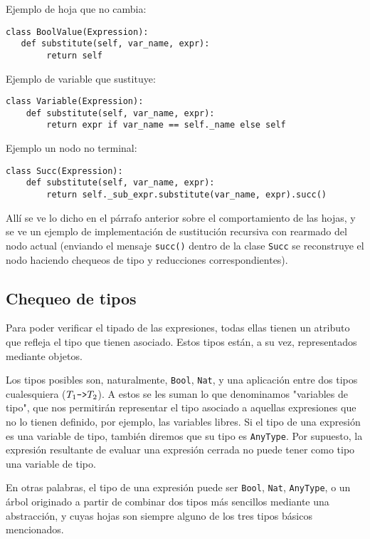 \documentclass[11pt]{article}
\begin{document}
Ejemplo de hoja que no cambia:
\begin{lstlisting}
class BoolValue(Expression):
   def substitute(self, var_name, expr):
        return self
\end{lstlisting}
        
Ejemplo de variable que sustituye:
\begin{lstlisting}
class Variable(Expression):
    def substitute(self, var_name, expr):
        return expr if var_name == self._name else self
\end{lstlisting}

Ejemplo un nodo no terminal:
\begin{lstlisting}
class Succ(Expression):
    def substitute(self, var_name, expr):
        return self._sub_expr.substitute(var_name, expr).succ()
\end{lstlisting}
        
Allí se ve lo dicho en el párrafo anterior sobre el comportamiento de las hojas, y se ve un ejemplo de implementación de sustitución recursiva con rearmado del nodo actual (enviando el mensaje \lstinline|succ()| dentro de la clase \lstinline|Succ| se reconstruye el nodo haciendo chequeos de tipo y reducciones correspondientes).

\subsection{Chequeo de tipos}

Para poder verificar el tipado de las expresiones, todas ellas tienen un
atributo que refleja el tipo que tienen asociado. Estos tipos están, a su
vez, representados mediante objetos.

Los tipos posibles son, naturalmente, \verb|Bool|, \verb|Nat|, y una
aplicación entre dos tipos cualesquiera ($T_1\verb|->|T_2$). A estos se les
suman lo que denominamos "variables de tipo", que nos permitirán representar
el tipo asociado a aquellas expresiones que no lo tienen definido, por
ejemplo, las variables libres. Si el tipo de una expresión es una variable
de tipo, también diremos que su tipo es \verb|AnyType|. Por supuesto, la
expresión resultante de evaluar una expresión cerrada no puede tener como
tipo una variable de tipo.

En otras palabras, el tipo de una expresión puede ser \verb|Bool|,
\verb|Nat|, \verb|AnyType|, o un árbol originado a partir de combinar dos
tipos más sencillos mediante una abstracción, y cuyas hojas son siempre
alguno de los tres tipos básicos mencionados.
\end{document}
